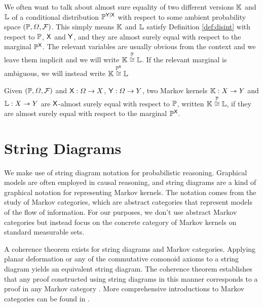 We often want to talk about almost sure equality of two different versions $\mathbb{K}$ and $\mathbb{L}$ of a conditional distribution $\mathbb{P}^{\mathsf{Y}|\mathsf{X}}$ with respect to some ambient probability space $(\mathbb{P},\Omega,\mathcal{F})$. This simply means $\mathbb{K}$ and $\mathbb{L}$ satisfy Definition \ref{def:disint} with respect to $\mathbb{P}$, $\mathsf{X}$ and $\mathsf{Y}$, and they are almost surely equal with respect to the marginal $\mathbb{P}^{\mathsf{X}}$. The relevant variables are usually obvious from the context and we leave them implicit and we will write $\mathbb{K}\overset{\mathbb{P}}{\cong}\mathbb{L}$. If the relevant marginal is ambiguous, we will instead write $\mathbb{K}\overset{\mathbb{P}^{\mathsf{X}}}{\cong}\mathbb{L}$

\begin{definition}
Given $(\mathbb{P},\Omega,\mathcal{F})$ and $\mathsf{X}:\Omega\to X$, $\mathsf{Y}:\Omega\to Y$, two Markov kernels $\mathbb{K}:X\rightarrowtriangle Y$ and $\mathbb{L}:X\rightarrowtriangle Y$ are $\mathsf{X}$-almost surely equal with respect to $\mathbb{P}$, written $\mathbb{K}\overset{\mathbb{P}}{\cong}\mathbb{L}$, if they are almost surely equal with respect to the marginal $\mathbb{P}^{\mathsf{X}}$.
\end{definition}

\section{String Diagrams}\label{ssec:mken_diagrams}

We make use of string diagram notation for probabilistic reasoning. Graphical models are often employed in causal reasoning, and string diagrams are a kind of graphical notation for representing Markov kernels. The notation comes from the study of Markov categories, which are abstract categories that represent models of the flow of information. For our purposes, we don't use abstract Markov categories but instead focus on the concrete category of Markov kernels on standard measurable sets.

A coherence theorem exists for string diagrams and Markov categories. Applying planar deformation or any of the commutative comonoid axioms to a string diagram yields an equivalent string diagram. The coherence theorem establishes that any proof constructed using string diagrams in this manner corresponds to a proof in any Markov category \citep{selinger_survey_2011}. More comprehensive introductions to Markov categories can be found in \citet{fritz_synthetic_2020,cho_disintegration_2019}.

